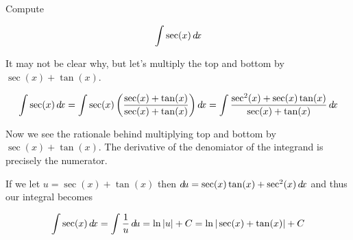 \documentclass{ximera}
\begin{document}
\begin{example}
Compute 

\[ 
\int \sec(x) \mathop{}\!d\! x
\]
\begin{explanation}
It may not be clear why, but let's multiply the top and bottom by $\sec(x) + \tan(x)$. 

\[
\int \sec(x) \mathop{}\!d\! x= \int \sec(x) \left( \frac{ \sec(x) + \tan(x)}{\sec(x)+\tan(x)} \right) \mathop{}\!d\! x = \int \frac{ \sec^{2}(x) + \sec(x)\tan(x)}{\sec(x)+\tan(x)} \mathop{}\!d\! x
\]

Now we see the rationale behind multiplying top and bottom by $\sec(x) + \tan(x)$. The derivative of the denomiator of the integrand is precisely the numerator. 

If we let $u=\sec(x)+\tan(x)$ then $\mathop{}\!d\! u=\sec(x)\tan(x)+\sec^{2}(x) \mathop{}\!d\! x$ and thus our integral becomes

\[
\int \sec(x) \mathop{}\!d\! x = \int \frac{1}{u} \mathop{}\!d\! u=\ln|u|+C=\ln|\sec(x)+\tan(x)|+C
\]

\end{explanation}

\end{example}
\end{document}
